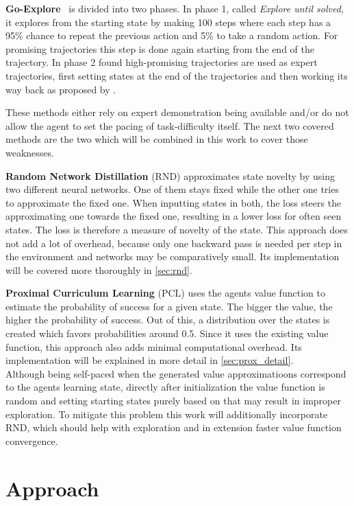 \documentclass{article}
\begin{document}
\textbf{Go-Explore}~\citep{go_explore} is divided into two phases. In phase 1, called \textit{Explore until solved}, it explores from the starting state by making 100 steps where each step has a 95\% chance to repeat the previous action and 5\% to take a random action. For promising trajectories this step is done again starting from the end of the trajectory.
In phase 2 found high-promising trajectories are used as expert trajectories, first setting states at the end of the trajectories and then working its way back as proposed by \cite{montezuma_demonstration}.

These methods either rely on expert demonstration being available and/or do not allow the agent to set the pacing of task-difficulty itself. The next two covered methods are the two which will be combined in this work to cover those weaknesses.

\textbf{Random Network Distillation} (RND) approximates state novelty by using two different neural networks. One of them stays fixed while the other one tries to approximate the fixed one. When inputting states in both, the loss steers the approximating one towards the fixed one, resulting in a lower loss for often seen states. The loss is therefore a measure of novelty of the state. This approach does not add a lot of overhead, because only one backward pass is needed per step in the environment and networks may be comparatively small. Its implementation will be covered more thoroughly in \cref{sec:rnd}.

\textbf{Proximal Curriculum Learning} (PCL) uses the agents value function to estimate the probability of success for a given state. The bigger the value, the higher the probability of success. Out of this, a distribution over the states is created which favors probabilities around 0.5. Since it uses the existing value function, this approach also adds minimal computational overhead. Its implementation will be explained in more detail in \cref{sec:prox_detail}. \\
Although being self-paced when the generated value approximatioons correspond to the agents learning state, directly after initialization the value function is random and setting starting states purely based on that may result in improper exploration. To mitigate this problem this work will additionally incorporate RND, which should help with exploration and in extension faster value function convergence.


\section{Approach}
\label{sec:Approach}
\end{document}
